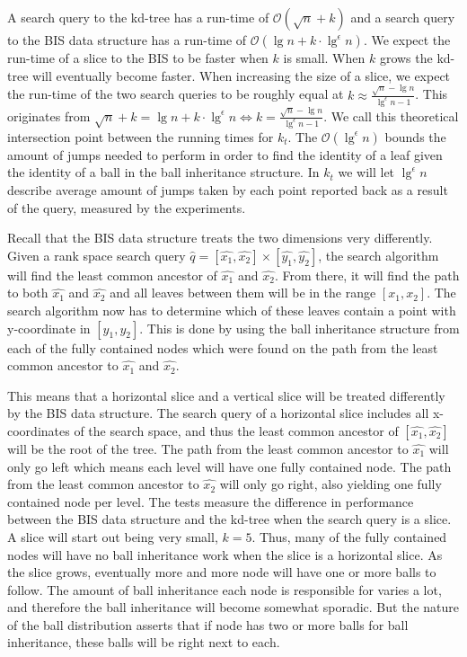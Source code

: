 A search query to the kd-tree has a run-time of $\mathcal{O}(\sqrt{n}+k)$ and a search query to the BIS data structure has a run-time of $\mathcal{O}(\lg n + k \cdot \lg^\epsilon n)$. We expect the run-time of a slice to the BIS to be faster when $k$ is small. When $k$ grows the kd-tree will eventually become faster. When increasing the size of a slice, we expect the run-time of the two search queries to be roughly equal at $k \approx \frac{\sqrt{n} - \lg n}{\lg^\epsilon n - 1}$. This originates from $\sqrt{n} + k = \lg n + k \cdot \lg^\epsilon n \Leftrightarrow k = \frac{\sqrt{n} - \lg n}{\lg^\epsilon n - 1}$. We call this theoretical intersection point between the running times for $k_t$. The $\mathcal{O}(\lg^\epsilon n)$ bounds the amount of jumps needed to perform in order to find the identity of a leaf given the identity of a ball in the ball inheritance structure. In $k_t$ we will let $\lg^\epsilon n$ describe average amount of jumps taken by each point reported back as a result of the query, measured by the experiments.

Recall that the BIS data structure treats the two dimensions very differently. Given a rank space search query $\hat{q} = [\hat{x_1}, \hat{x_2}] \times [\hat{y_1}, \hat{y_2}]$, the search algorithm will find the least common ancestor of $\hat{x_1}$ and $\hat{x_2}$. From there, it will find the path to both $\hat{x_1}$ and $\hat{x_2}$ and all leaves between them will be in the range $[x_1, x_2]$. The search algorithm now has to determine which of these leaves contain a point with y-coordinate in $[y_1, y_2]$. This is done by using the ball inheritance structure from each of the fully contained nodes which were found on the path from the least common ancestor to $\hat{x_1}$ and $\hat{x_2}$.

This means that a horizontal slice and a vertical slice will be treated differently by the BIS data structure. The search query of a horizontal slice includes all x-coordinates of the search space, and thus the least common ancestor of $[\hat{x_1}, \hat{x_2}]$ will be the root of the tree. The path from the least common ancestor to $\hat{x_1}$ will only go left which means each level will have one fully contained node. The path from the least common ancestor to $\hat{x_2}$ will only go right, also yielding one fully contained node per level. The tests measure the difference in performance between the BIS data structure and the kd-tree when the search query is a slice. A slice will start out being very small, $k=5$. Thus, many of the fully contained nodes will have no ball inheritance work when the slice is a horizontal slice. As the slice grows, eventually more and more node will have one or more balls to follow. The amount of ball inheritance each node is responsible for varies a lot, and therefore the ball inheritance will become somewhat sporadic. But the nature of the ball distribution asserts that if node has two or more balls for ball inheritance, these balls will be right next to each.

